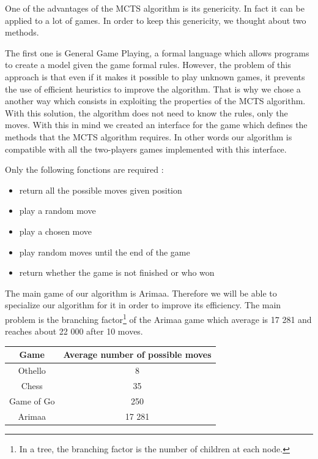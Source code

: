 One of the advantages of the MCTS algorithm is its genericity. In fact it can be applied to a lot of games. In order to keep this genericity, we thought about two methods.

The first one is General Game Playing\cite{General_Game_Playing}, a formal language which allows programs to create a model given the game formal rules. However, the problem of this approach is that even if it makes it possible to play unknown games, it prevents the use of efficient heuristics to improve the algorithm.
That is why we chose a another way which consists in exploiting the properties of the MCTS algorithm. 
With this solution, the algorithm does not need to know the rules, only the moves. With this in mind we created an interface for the game which defines the methods that the MCTS algorithm requires. In other words our algorithm is compatible with all the two-players games implemented with this interface.

Only the following fonctions are required : 
\begin{itemize}
\item return all the possible moves given position
\item play a random move
\item play a chosen move 
\item play random moves until the end of the game
\item return whether the game is not finished or who won
\end{itemize}

The main game of our algorithm is Arimaa. Therefore we will be able to specialize our algorithm for it in order to improve its efficiency. The main problem is the branching factor\footnote{In a tree, the branching factor is the number of children at each node.} of the Arimaa game which average is 17 281 and reaches about 22 000 after 10 moves\cite{branchin_factor}.\\

\begin{center}
	\begin{tabular}{ | c | c |}
		\hline Game & Average number of possible moves \\ \hline
		\hline  
		Othello & 8\\
		\hline  
		Chess & 35\\
		\hline  
		Game of Go & 250\\
		\hline
		Arimaa & 17 281\\
		\hline
	\end{tabular}
\end{center}

